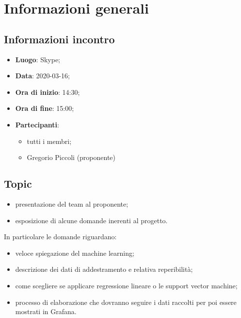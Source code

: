 \section{Informazioni generali}
\subsection{Informazioni incontro}
\begin{itemize}
\item \textbf{Luogo}: Skype;
\item \textbf{Data}: 2020-03-16;
\item \textbf{Ora di inizio}: 14:30;
\item \textbf{Ora di fine}: 15:00;
\item \textbf{Partecipanti}:
	\begin{itemize}
		\item tutti i membri;
		\item Gregorio Piccoli (proponente)
	\end{itemize}
\end{itemize}

\subsection{Topic}
\begin{itemize}
	\item presentazione del team al proponente;
	\item esposizione di alcune domande inerenti al progetto.
\end{itemize}
In particolare le domande riguardano:
\begin{itemize}
	\item veloce spiegazione del machine learning\glo;
	\item descrizione dei dati di addestramento e relativa reperibilità;
	\item come scegliere se applicare regressione lineare o le support vector machine;
	\item processo di elaborazione che dovranno seguire i dati raccolti per poi essere mostrati in Grafana.
\end{itemize}